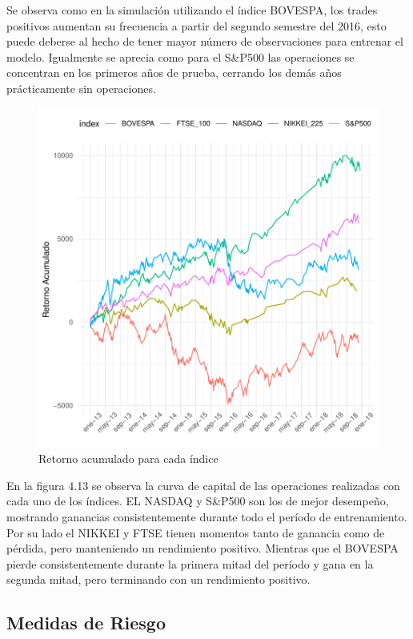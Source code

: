 \documentclass[a4paper,12pt]{Latex/Classes/PhDthesisPSnPDF}
\begin{document}
Se observa como en la simulación utilizando el índice BOVESPA, los trades positivos aumentan su frecuencia a partir del segundo semestre del 2016, esto puede deberse al hecho de tener mayor número de observaciones para entrenar el modelo. Igualmente se aprecia como para el S\&P500 las operaciones se concentran en los primeros años de prueba, cerrando los demás años prácticamente sin operaciones.


\begin{figure}[H]
\centering
\includegraphics{main-033}
\caption{Retorno acumulado para cada índice}
\end{figure}

En la figura 4.13 se observa la curva de capital de las operaciones realizadas con cada uno de los índices. EL NASDAQ y S\&P500 son los de mejor desempeño, mostrando ganancias consistentemente durante todo el período de entrenamiento. Por su lado el NIKKEI y FTSE tienen momentos tanto de ganancia como de pérdida, pero manteniendo un rendimiento positivo. Mientras que el BOVESPA pierde consistentemente durante la primera mitad del período y gana en la segunda mitad, pero terminando con un rendimiento positivo.

\subsection{Medidas de Riesgo}
\end{document}
